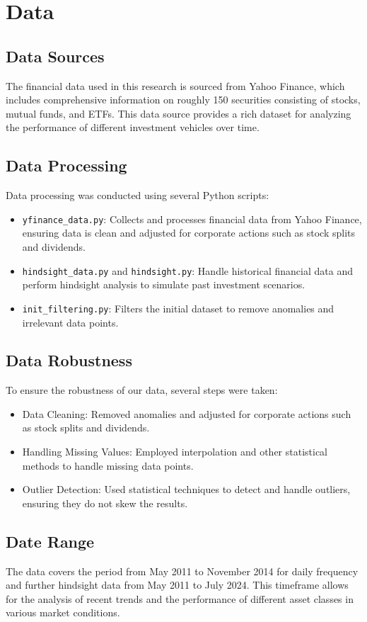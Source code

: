 \section{Data}
\subsection{Data Sources}
The financial data used in this research is sourced from Yahoo Finance, which includes comprehensive information on roughly 150 securities consisting of stocks, mutual funds, and ETFs. This data source provides a rich dataset for analyzing the performance of different investment vehicles over time.

\subsection{Data Processing}
Data processing was conducted using several Python scripts:
\begin{itemize}
    \item \texttt{yfinance\_data.py}: Collects and processes financial data from Yahoo Finance, ensuring data is clean and adjusted for corporate actions such as stock splits and dividends.
    \item \texttt{hindsight\_data.py} and \texttt{hindsight.py}: Handle historical financial data and perform hindsight analysis to simulate past investment scenarios.
    \item \texttt{init\_filtering.py}: Filters the initial dataset to remove anomalies and irrelevant data points.
\end{itemize}

\subsection{Data Robustness}
To ensure the robustness of our data, several steps were taken:
\begin{itemize}
    \item Data Cleaning: Removed anomalies and adjusted for corporate actions such as stock splits and dividends.
    \item Handling Missing Values: Employed interpolation and other statistical methods to handle missing data points.
    \item Outlier Detection: Used statistical techniques to detect and handle outliers, ensuring they do not skew the results.
\end{itemize}

\subsection{Date Range}
The data covers the period from May 2011 to November 2014 for daily frequency and further hindsight data from May 2011 to July 2024. This timeframe allows for the analysis of recent trends and the performance of different asset classes in various market conditions.

